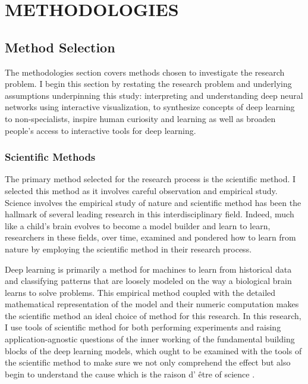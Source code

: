 \chapter{METHODOLOGIES}

\graphicspath{ {./methodologies/} }
\thispagestyle{empty}


\section{Method Selection}

The methodologies section covers methods chosen to investigate the research problem. I begin this section by restating the research problem and underlying assumptions underpinning this study: interpreting and understanding deep neural networks using interactive visualization, to 
synthesize concepts of deep learning to non-specialists, inspire human curiosity and learning as well as broaden people’s access to interactive tools for deep learning.

\subsection{Scientific Methods}

The primary method selected for the research process is the scientific method. I selected this method as it involves careful observation and empirical study. Science involves the empirical study of nature and scientific method has been the hallmark of several leading research in this interdisciplinary field. Indeed, much like a child’s brain evolves to become a model builder and learn to learn, researchers in these fields, over time, examined and pondered how to learn from nature by employing the scientific method in their research process. 


Deep learning is primarily a method for machines to learn from historical data and classifying patterns that are loosely modeled on the way a biological brain learns to solve problems. This empirical method coupled with the detailed mathematical representation of the model and their numeric computation makes the scientific method an ideal choice of method for this research. In this research, I use tools of scientific method for both performing experiments and raising application-agnostic questions of the inner working of the fundamental building blocks of the deep learning models, which ought to be examined with the tools of the scientific method to make sure we not only comprehend the effect but also begin to understand the cause which is the raison d’ \^{e}tre of science \cite{edsarx.1904.1092220190101}.

